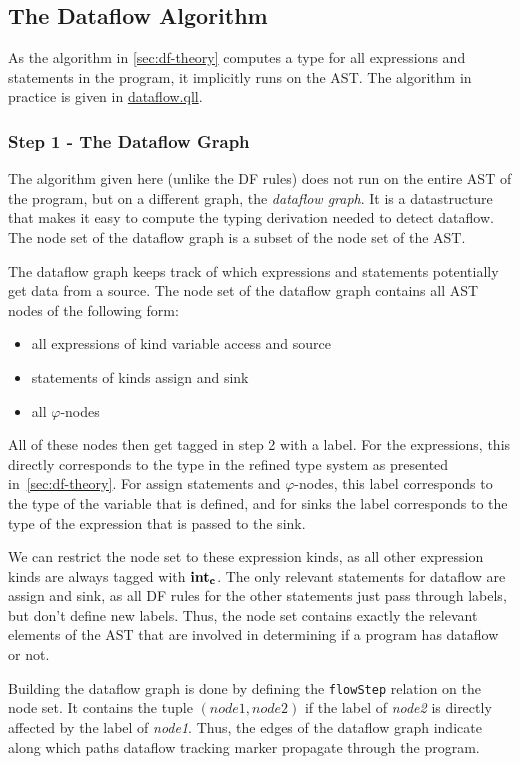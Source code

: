 \subsection{The Dataflow Algorithm}
As the algorithm in \autoref{sec:df-theory} computes a type for all expressions and statements in the program,
it implicitly runs on the AST.
The algorithm in practice is given in \hyperref[lst:dataflow]{dataflow.qll}.

\subsubsection*{Step 1 - The Dataflow Graph}
The algorithm given here (unlike the DF rules) does not run on the entire AST of the program,
but on a different graph, the \emph{dataflow graph}.
It is a datastructure that makes it easy to compute the typing derivation needed to
detect dataflow.
The node set of the dataflow graph is a subset of the node set of the AST.

The dataflow graph keeps track of which expressions and statements potentially get data from a source.
The node set of the dataflow graph contains all AST nodes of the following form:
\begin{itemize}
    \item all expressions of kind variable access and source
    \item statements of kinds assign and sink
    \item all $\varphi$-nodes
\end{itemize}

All of these nodes then get tagged in step 2 with a label.
For the expressions, this directly corresponds to the type in the refined type system
as presented in~\autoref{sec:df-theory}.
For assign statements and $\varphi$-nodes, this label corresponds to the type of 
the variable that is defined, and for sinks the label corresponds to the type
of the expression that is passed to the sink.

We can restrict the node set to these expression kinds, as all other expression kinds
are always tagged with $\textbf{int}_\textbf{c}$.
The only relevant statements for dataflow are assign and sink, as all DF rules for the 
other statements just pass through labels, but don't define new labels.
Thus, the node set contains  exactly the relevant elements of the AST that are involved in determining
if a program has dataflow or not.

Building the dataflow graph is done by defining the \texttt{flowStep} relation on the node set.
It contains the tuple $(\textit{node1}, \textit{node2})$ if the label of \textit{node2} is directly affected
by the label of \textit{node1}.
Thus, the edges of the dataflow graph indicate along which paths dataflow tracking marker propagate
through the program.

